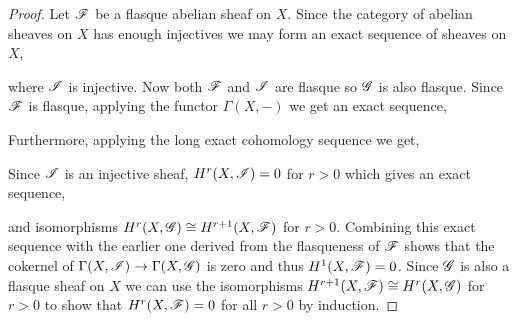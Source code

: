 \documentclass[12pt]{article}
\begin{document}
\begin{proof}
Let $\mathscr{F}$ be a flasque abelian sheaf on $X$. Since the category of abelian sheaves on $X$ has enough injectives we may form an exact sequence of sheaves on $X$,
\begin{center}
\end{center} 
where $\mathscr{I}$ is injective. Now both $\mathscr{F}$ and $\mathscr{I}$ are flasque so $\mathscr{G}$ is also flasque. Since $\mathscr{F}$ is flasque, applying the functor $\Gamma(X, -)$ we get an exact sequence,
\begin{center}
\end{center} 
Furthermore, applying the long exact cohomology sequence we get,
\begin{center}
\end{center}
Since $\mathscr{I}$ is an injective sheaf, $H^r(X, \mathscr{I}) = 0$ for $r > 0$ which gives an exact sequence,
\begin{center}
\end{center}
and isomorphisms $H^r(X, \mathscr{G}) \cong H^{r+1}(X, \mathscr{F})$ for $r > 0$. Combining this exact sequence with the earlier one derived from the flasqueness of $\mathscr{F}$ shows that the cokernel of $\Gamma(X, \mathscr{I}) \to \Gamma(X, \mathscr{G})$ is zero and thus $H^1(X, \mathscr{F}) = 0$. Since $\mathscr{G}$ is also a flasque sheaf on $X$ we can use the isomorphisms $H^{r+1}(X, \mathscr{F}) \cong H^r(X, \mathscr{G})$ for $r > 0$ to show that $H^r(X, \mathscr{F}) = 0$ for all $r > 0$ by induction.  
\end{proof}
\end{document}

